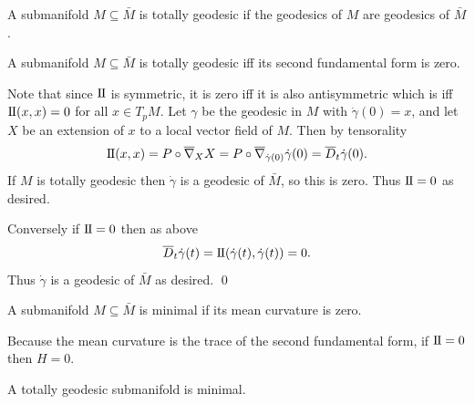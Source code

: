 \eproof

\bdefn

    A submanifold $M\subseteq\bar M$ is {\emphcolor totally geodesic} if the geodesics of $M$ are geodesics of $\bar M$.

\edefn

\bprop

    A submanifold $M\subseteq\bar M$ is totally geodesic iff its second fundamental form is zero.

\eprop

\bproof

    Note that since ${\rm I\mkern-1mu\relax I}$ is symmetric, it is zero iff it is also antisymmetric which is iff ${\rm I\mkern-1mu\relax I}(x,x)=0$ for all
    $x\in T_pM$.
    Let $\gamma$ be the geodesic in $M$ with $\dot\gamma(0)=x$, and let $X$ be an extension of $x$ to a local vector field
    of $M$.
    Then by tensorality
    $$ {\rm I\mkern-1mu\relax I}(x,x) = P\circ\overline\nabla_XX = P\circ\overline\nabla_{\dot\gamma(0)}\dot\gamma(0) = \overline D_t\dot\gamma(0) . $$
    If $M$ is totally geodesic then $\dot\gamma$ is a geodesic of $\bar M$, so this is zero.
    Thus ${\rm I\mkern-1mu\relax I}=0$ as desired.

    Conversely if ${\rm I\mkern-1mu\relax I}=0$ then as above
    $$ \overline D_t\dot\gamma(t) = {\rm I\mkern-1mu\relax I}(\dot\gamma(t),\dot\gamma(t)) = 0 . $$
    Thus $\dot\gamma$ is a geodesic of $\bar M$ as desired.
    \qed

\eproof

\bdefn

    A submanifold $M\subseteq\bar M$ is {\emphcolor minimal} if its mean curvature is zero.

\edefn

Because the mean curvature is the trace of the second fundamental form, if ${\rm I\mkern-1mu\relax I}=0$ then $H=0$.

\bcoro

    A totally geodesic submanifold is minimal.

\ecoro


